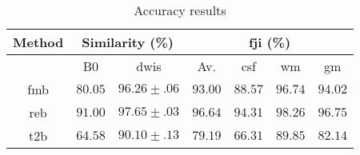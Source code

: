 
\begin{table}[h]
\caption{Accuracy results}
\label{table:results}
\begin{center}
\begin{tabular}{c||cc|cccc}
\hline
Method & \multicolumn{2}{c|}{Similarity (\%)} & \multicolumn{4}{c}{\gls*{fji} (\%)} \\
\hline
 & B0 & \glspl*{dwi} & Av. & \gls*{csf} & \gls*{wm} & \gls*{gm} \\
\hline
\gls*{fmb} & $80.05$ & $96.26\pm.06$ & $93.00$ & $88.57$ & $96.74$ & $94.02$ \\
\hline
\gls*{reb} & $91.00$ & $97.65\pm.03$ & $96.64$ & $94.31$ & $98.26$ & $96.75$ \\
\hline
\gls*{t2b} & $64.58$ & $90.10\pm.13$ & $79.19$ & $66.31$ & $89.85$ & $82.14$ \\
\hline
\end{tabular}
\end{center}
\end{table}